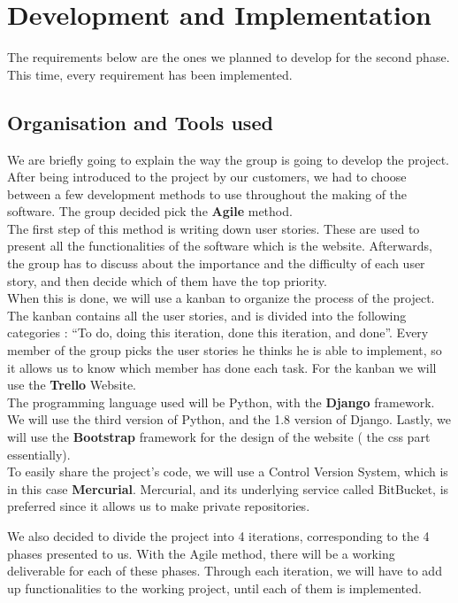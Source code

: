 \documentclass[a4paper, 12pt]{article}
\begin{document}
\newpage
\section{Development and Implementation}

The requirements below are the ones we planned to develop for the second phase. This time, every requirement has been implemented. \\

\subsection{Organisation and Tools used}
We are briefly going to explain the way the group is going to develop the project. After being introduced to the project by our customers, we had to choose between a few development methods to use throughout the making of the software. The group decided pick the \textbf{Agile} method. \\

The first step of this method is writing down user stories. These are used to present all the functionalities of the software which is the website. Afterwards, the group has to discuss about the importance and the difficulty of each user story, and then decide which of them have the top priority. \\

When this is done, we will use a kanban to organize the process of the project. The kanban contains all the user stories, and is divided into the following categories : “To do, doing this iteration, done this iteration, and done”. Every member of the group picks the user stories he thinks he is able to implement, so it allows us to know which member has done each task. For the kanban we will use the \textbf{Trello} Website. \\

The programming language used will be Python, with the \textbf{Django} framework. We will use the third version of Python, and the 1.8 version of Django. Lastly, we will use the \textbf{Bootstrap} framework for the design of the website ( the css part essentially). \\

To easily share the project’s code, we will use a Control Version System, which is in this case \textbf{Mercurial}. Mercurial, and its underlying service called BitBucket, is preferred since it allows us to make private repositories. 

We also decided to divide the project into 4 iterations, corresponding to the 4 phases presented to us. With the Agile method, there will be a working deliverable for each of these phases. Through each iteration, we will have to add up functionalities to the working project, until each of them is implemented.  \\
\end{document}

